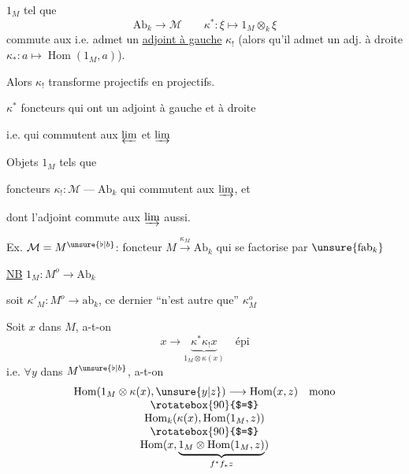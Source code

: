 $1_M$ tel que
\[
\mathrm{Ab}_k\longrightarrow\mathcal M\qquad
\kappa^*: \xi\longmapsto1_M\otimes_k\xi
\]
commute aux  \inserted{$\varprojlim$}
i.e. admet un \uline{adjoint à gauche} $\kappa_!$
(alors qu'il admet un adj. à droite
$\kappa_*:a\longmapsto\operatorname{Hom}(1_M,a)$).

Alors $\kappa_!$ transforme projectifs en projectifs.


$\kappa^*$ foncteurs 
qui ont un adjoint à gauche et à droite

i.e. qui 
commutent aux $\varprojlim$ et $\varinjlim$

Objets $1_M$ tels que

foncteurs $\kappa_!:\mathcal M\mathbin{\text{---}}\mathrm{Ab}_k$
qui commutent aux $\varinjlim$, et

dont l'adjoint  commute aux $\varinjlim$ aussi.

Ex. $\mathcal M=M^{\unsure{\flat|b}}$:
foncteur $M\xrightarrow{\kappa_M}\mathrm{Ab}_k$ qui se factorise par
$\unsure{\mathrm{fab}_k}$

\uline{NB} $1_M:M^o\longrightarrow\mathrm{Ab}_k$

soit $\kappa'_M:M^o\longrightarrow\mathrm{ab}_k$,
ce dernier ``n'est autre que'' $\kappa_M^o$

Soit $x$ dans $M$, a-t-on
\[
x\longrightarrow\underbrace{\kappa^*\kappa_!x}_{1_M\otimes\kappa(x)}
\quad\text{épi}
\]
i.e. $\forall y$ dans $M^{\unsure{\flat|b}}$, a-t-on
\[
\begin{array}{c}
\operatorname{Hom}(1_M\otimes\kappa(x),\unsure{y|z})
\longrightarrow\operatorname{Hom}(x,z)\quad\text{mono}\\
\rotatebox{90}{$=$}\\
\operatorname{Hom}_k(\kappa(x),\operatorname{Hom}(1_M,z))\\
\rotatebox{90}{$=$}\\
\operatorname{Hom}(x,\underbrace{1_M\otimes\operatorname{Hom}(1_M,z)}_{f^*f_*z})
\end{array}
\]

